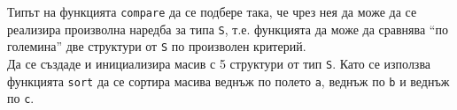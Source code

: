 \documentclass[12pt,a4paper]{article}
\begin{document}
\begin{enumerate}
	Типът на функцията \texttt{compare} да се подбере така, че чрез нея да може да се реализира произволна наредба за типа \texttt{S}, т.е. функцията да може да сравнява ``по големина'' две структури от \texttt{S} по произволен критерий.\\

	Да се създаде и инициализира масив с 5 структури от тип \texttt{S}. Като се използва функцията \texttt{sort} да се сортира масива веднъж по полето \texttt{a}, веднъж по \texttt{b} и веднъж по \texttt{c}.


\end{enumerate}
\end{document}
